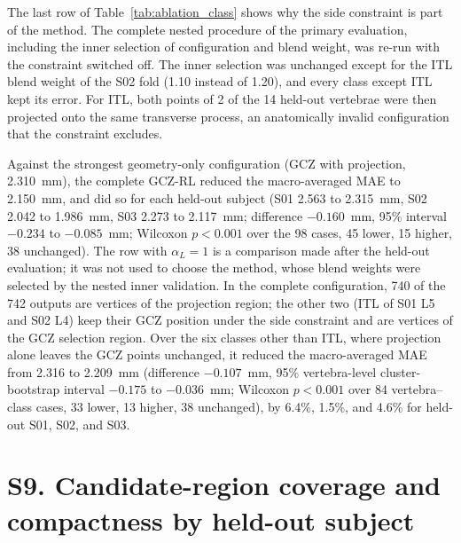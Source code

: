 \documentclass[10pt,a4paper]{article}
\begin{document}
The last row of Table~\ref{tab:ablation_class} shows why the side constraint is part of the method. The complete nested procedure of the primary evaluation, including the inner selection of configuration and blend weight, was re-run with the constraint switched off. The inner selection was unchanged except for the ITL blend weight of the S02 fold (1.10 instead of 1.20), and every class except ITL kept its error. For ITL, both points of 2 of the 14 held-out vertebrae were then projected onto the same transverse process, an anatomically invalid configuration that the constraint excludes.

\begin{table}[h]
\centering
\small
\caption{Component ablation of the primary evaluation by ligament class: MAE (mm) over the 14 held-out vertebrae.}
\label{tab:ablation_class}
\end{table}

Against the strongest geometry-only configuration (GCZ with projection, 2.310~mm), the complete GCZ-RL reduced the macro-averaged MAE to 2.150~mm, and did so for each held-out subject (S01 2.563 to 2.315~mm, S02 2.042 to 1.986~mm, S03 2.273 to 2.117~mm; difference $-0.160$~mm, 95\% interval $-0.234$ to $-0.085$~mm; Wilcoxon $p<0.001$ over the 98 cases, 45 lower, 15 higher, 38 unchanged). The row with $\alpha_L=1$ is a comparison made after the held-out evaluation; it was not used to choose the method, whose blend weights were selected by the nested inner validation. In the complete configuration, 740 of the 742 outputs are vertices of the projection region; the other two (ITL of S01 L5 and S02 L4) keep their GCZ position under the side constraint and are vertices of the GCZ selection region. Over the six classes other than ITL, where projection alone leaves the GCZ points unchanged, it reduced the macro-averaged MAE from 2.316 to 2.209~mm (difference $-0.107$~mm, 95\% vertebra-level cluster-bootstrap interval $-0.175$ to $-0.036$~mm; Wilcoxon $p<0.001$ over 84 vertebra--class cases, 33 lower, 13 higher, 38 unchanged), by 6.4\%, 1.5\%, and 4.6\% for held-out S01, S02, and S03.

\section*{S9. Candidate-region coverage and compactness by held-out subject}
\end{document}
